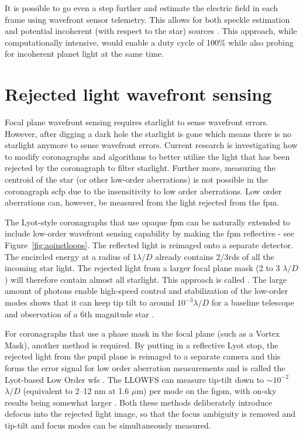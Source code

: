 \documentclass[letterpaper]{ar-1col}
\newcommand{\mum}{$\mu$m}
\newcommand{\ld}{$\lambda/D$}
\begin{document}
It is possible to go even a step further and estimate the electric field in each frame using wavefront sensor telemetry.
%
This allows for both speckle estimation and potential incoherent (with respect to the star) sources \citep{rodack2021millisecond, frazin2021millisecond}. 
%
This approach, while computationally intensive, would enable a duty cycle of 100\% while also probing for incoherent planet light at the same time.

\section{Rejected light wavefront sensing}

Focal plane wavefront sensing requires starlight to sense wavefront errors.
%
However, after digging a dark hole the starlight is gone which means there is no starlight anymore to sense wavefront errors.
%
Current research is investigating how to modify coronagraphs and algorithms to better utilize the light that has been rejected by the coronagraph to filter starlight.
%
Further more, measuring the centroid of the star (or other low-order aberrations) is not possible in the coronagraph \ac{scfp} due to the insensitivity to low order aberrations.
%
Low order aberrations can, however, be measured from the light rejected from the \ac{fpm}.

The Lyot-style coronagraphs that use opaque \ac{fpm} can be naturally extended to include low-order wavefront sensing capability by making the \ac{fpm} reflective - see Figure~\ref{fig:aoinstloops}.
%
The reflected light is reimaged onto a separate detector.
%
The encircled energy at a radius of 1$\lambda/D$ already contains 2/3rds of all the incoming star light.
%
The rejected light from a larger focal plane mask (2 to 3 \ld{}) will therefore contain almost all starlight.
%
This approach is called \citep[Coronagraphic low order \ac{wfs}; CLOWFS - ][]{Guyon09}.
%
The large amount of photons enable high-speed control and stabilization of the low-order modes shows that it can keep tip tilt to around $10^{-3}$\ld{} for a baseline telescope and observation of a 6th magnitude star \citep{Guyon09}.


For coronagraphs that use a phase mask in the focal plane (such as a Vortex Mask), another method is required.
%
By putting in a reflective Lyot stop, the rejected light from the pupil plane is reimaged to a separate camera and this forms the error signal for low order aberration measurements and is called the Lyot-based Low Order \ac{wfs} \citep[LLOWFS; ][]{Singh14,Singh15}.
%
The LLOWFS can measure tip-tilt down to $\sim 10^{-2}$\ld{} (equivalent to 2–12 nm at 1.6 \mum{}) per mode on the \ac{fqpm}, with on-sky results being somewhat larger \citep{Singh15}.
%
Both these methods deliberately introduce defocus into the rejected light image, so that the focus ambiguity is removed and tip-tilt and focus modes can be simultaneously measured.
\end{document}
